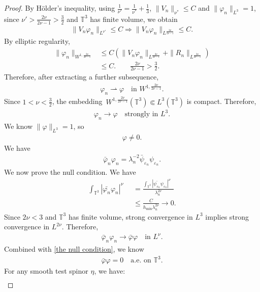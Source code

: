 \documentclass[10pt,a4paper]{amsart}
\newcommand{\T}{\mathbb{T}}
\newcommand{\dd}{\mathop{}\!\mathrm{d}}
\DeclareMathOperator{\dv}{\dd{vol}}
\newcommand{\eps}{\varepsilon}
\begin{document}
\begin{proof}
By H\"{o}lder's inequality, using $\frac1{\nu'}=\frac1{\nu^*}+\frac13$, $\|V_n\|_{\nu^*}\le C$ and $\|\varphi_n\|_{L^3}=1$, since $ \nu'>\frac{2\nu}{2\nu-1}>\frac{3}{2}$ and $\T^3$ has finite volume, we obtain \begin{align}
\|V_n\varphi_n\|_{L^{ \nu'}}\leq C \Rightarrow\|V_n\varphi_n\|_{L^{\frac{2\nu}{2\nu-1}}}\leq C.
\end{align}
By elliptic regularity,
\begin{align}
\|\varphi_n\|_{W^{1,\frac{2\nu}{2\nu-1}}}
&\le
C\left(
\|V_n\varphi_n\|_{L^{\frac{2\nu}{2\nu-1}}}
+\|R_n\|_{L^{\frac{2\nu}{2\nu-1}}}
\right)\\
&\le C.\qquad \frac{2\nu}{2\nu-1}>\frac{3}{2}.
\end{align}
Therefore, after extracting a further subsequence,
\begin{align}
\varphi_n\rightharpoonup\varphi
\quad\text{in }W^{1,\frac{2\nu}{2\nu-1}}.
\end{align}
Since $1<\nu<\frac{3}{2}$, the embedding~$W^{1,\frac{2\nu}{2\nu-1}}(\T^3)\Subset L^{3}(\T^3)$ is compact. Therefore,
\begin{align}
\varphi_n\to\varphi
\quad\text{strongly in }L^3.
\end{align}
We know $\|\varphi\|_{L^3}=1$, so
\begin{align}
\varphi\ne0.
\end{align}
We have 
\begin{align}
\bar\varphi_n\varphi_n=
\lambda_n^{-2}
\bar\psi_{\eps_n}\psi_{\eps_n}.
\end{align}
We now prove the null condition. We have
\begin{align}\label{the null condition}
\int_{\T^3}|\bar{\varphi_n}\varphi_n|^{\nu}\dv&=\frac{\int_{\T^3}|\bar{\psi_{\eps_n}}\psi_{\eps_n}|^{\nu}\dv}{\lambda_n^{2\nu}}\\
&\leq \frac{C}{h_{\min}\lambda_n^{2\nu}}\to0.
\end{align}
Since $2\nu<3$ and $\T^3$ has finite volume, strong convergence in $L^3$ implies strong convergence in $L^{2\nu}$. Therefore,
\begin{align}
\bar\varphi_n\varphi_n\to\bar\varphi\varphi
\quad\text{in }L^\nu.
\end{align}
Combined with \eqref{the null condition}, we know
\begin{align}
\bar\varphi\varphi=0
\quad\text{a.e. on }\T^3.
\end{align}
For any smooth test spinor $\eta$, we have:
\begin{align}

\end{align}
\end{proof}
\end{document}
